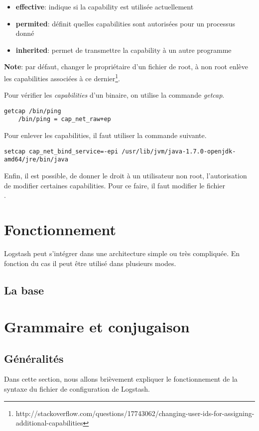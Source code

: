\begin{itemize}
    \item \textbf{effective}: indique si la capability est utilisée actuellement
    \item \textbf{permited}: définit quelles capabilities sont autorisées pour un 
    processus donné
    \item \textbf{inherited}: permet de transmettre la capability à un autre programme
\end{itemize}
\textbf{Note}: par défaut, changer le propriétaire d'un fichier de root, à non root enlève
les capabilities associées à ce dernier\footnote{\scriptsize{http://stackoverflow.com/questions/17743062/changing-user-ids-for-assigning-additional-capabilities}}.

Pour vérifier les \textit{capabilities} d'un binaire, on utilise la commande 
\emph{getcap}.

\begin{lstlisting}[style=code,label={lst:getcapabilities}]
    getcap /bin/ping
    /bin/ping = cap_net_raw+ep
\end{lstlisting}

Pour enlever les capabilities, il faut utiliser la commande suivante.
\begin{lstlisting}[style=code,label={lst:unsetcapabilities}]
setcap cap_net_bind_service=-epi /usr/lib/jvm/java-1.7.0-openjdk-amd64/jre/bin/java
\end{lstlisting}

Enfin, il est possible, de donner le droit à un utilisateur non root, l'autorisation
de modifier certaines capabilities. Pour ce faire, il faut modifier le fichier \\[1mm]
.

\section{Fonctionnement}
Logstash peut s'intégrer dans une architecture simple ou très compliquée. En fonction
du cas il peut être utilisé dans plusieurs modes.
\subsection{La base}


\section{Grammaire et conjugaison}
\subsection{Généralités}
Dans cette section, nous allons brièvement expliquer le fonctionnement de la syntaxe 
du fichier de configuration de Logstash.

